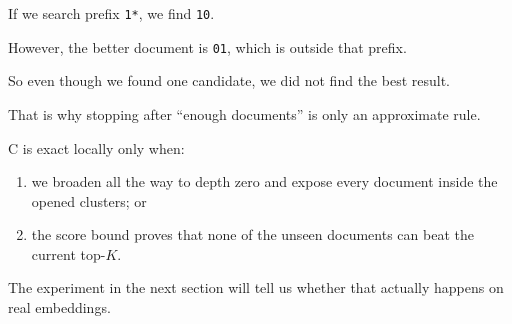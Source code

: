If we search prefix \texttt{1*}, we find \texttt{10}.

However, the better document is \texttt{01}, which is outside that prefix.

So even though we found one candidate, we did not find the best result.

That is why stopping after ``enough documents'' is only an approximate rule.

C is exact locally only when:
\begin{enumerate}\setlength{\itemsep}{1pt}
\item we broaden all the way to depth zero and expose every document inside the opened clusters; or
\item the score bound proves that none of the unseen documents can beat the current top-$K$.
\end{enumerate}

\begin{center}\setlength{\fboxsep}{9pt}\end{center}



The experiment in the next section will tell us whether that actually happens on real embeddings.
